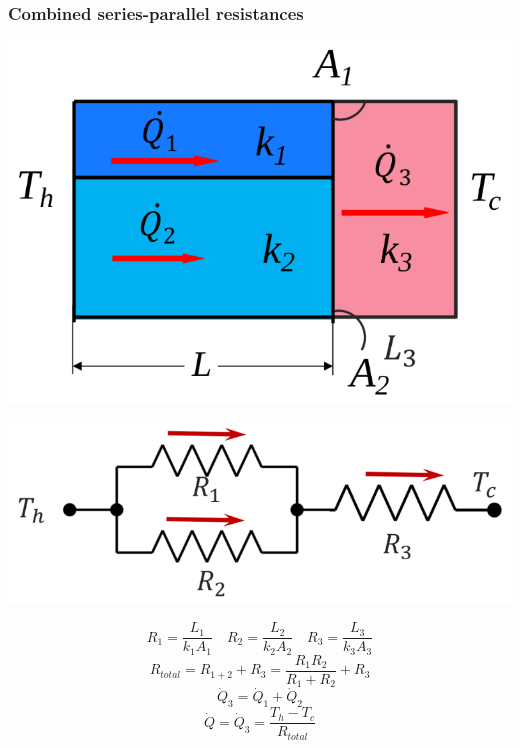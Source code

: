 \documentclass[11pt]{article}
\begin{document}
\subsubsection{Combined series-parallel resistances}
\label{sec:org497c8d3}
\begin{center}
\includegraphics[width=.9\linewidth]{./images/thermal-resistances-combined.png}
\end{center}
\begin{center}
\includegraphics[width=.9\linewidth]{./images/thermal-resistances-combined-electrical-analogy.png}
\end{center}
\[R_1 = \frac{L_1}{k_1 A_1} \quad R_2 = \frac{L_2}{k_2 A_2} \quad R_3 = \frac{L_3}{k_3 A_3}\]
\[R_{total} = R_{1 + 2} + R_3 = \frac{R_1 R_2}{R_1 + R_2} + R_3\]
\[\dot{Q}_3 = \dot{Q}_1 + \dot{Q}_2\]
\[\dot{Q} = \dot{Q}_3 = \frac{T_h - T_c}{R_{total}}\]
\end{document}
